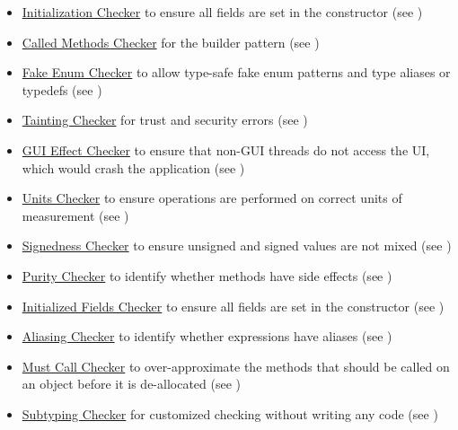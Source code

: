 \begin{itemize}
\item
  \hyperref[initialization-checker]{Initialization Checker} to ensure all
  fields are set in the constructor (see
  )
\item
  \hyperref[called-methods-checker]{Called Methods Checker} for
  the builder pattern (see )
\item
  \hyperref[fenum-checker]{Fake Enum Checker} to allow type-safe fake enum
  patterns and type aliases or typedefs (see )
\item
  \hyperref[tainting-checker]{Tainting Checker} for trust and security errors
  (see )
\item
  \hyperref[guieffect-checker]{GUI Effect Checker} to ensure that non-GUI
  threads do not access the UI, which would crash the application
  (see )
\item
  \hyperref[units-checker]{Units Checker} to ensure operations are
  performed on correct units of measurement
  (see )
\item
  \hyperref[signedness-checker]{Signedness Checker} to
  ensure unsigned and signed values are not mixed
  (see )
\item
  \hyperref[purity-checker]{Purity Checker} to identify whether
  methods have side effects (see )
\item
  \hyperref[initialized-fields-checker]{Initialized Fields Checker} to ensure all
  fields are set in the constructor (see
  )
\item
  \hyperref[aliasing-checker]{Aliasing Checker} to identify whether
  expressions have aliases (see )
\item
  \hyperref[must-call-checker]{Must Call Checker} to over-approximate the
  methods that should be called on an object before it is de-allocated (see )
\item
  \hyperref[subtyping-checker]{Subtyping Checker} for customized checking without
  writing any code (see )
\end{itemize}




